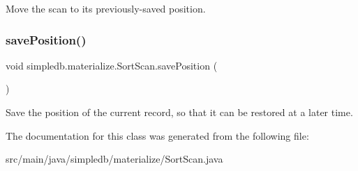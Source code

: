 Move the scan to its previously-\/saved position. \mbox{\label{classsimpledb_1_1materialize_1_1SortScan_a58bd86766d38fce4c85b214a13cd4f5d}} 
\subsubsection{\texorpdfstring{save\+Position()}{savePosition()}}
{\footnotesize\ttfamily void simpledb.\+materialize.\+Sort\+Scan.\+save\+Position (\begin{DoxyParamCaption}{ }\end{DoxyParamCaption})\hspace{0.3cm}{\ttfamily [inline]}}

Save the position of the current record, so that it can be restored at a later time. 

The documentation for this class was generated from the following file\+:\begin{DoxyCompactItemize}
\item 
src/main/java/simpledb/materialize/Sort\+Scan.\+java\end{DoxyCompactItemize}
